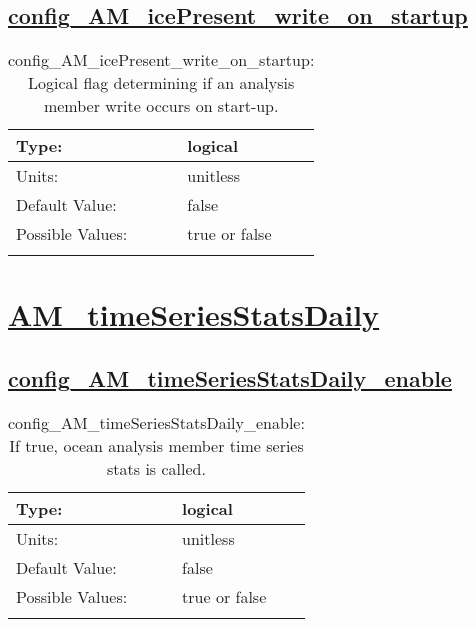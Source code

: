 \subsection[config\_AM\_icePresent\_write\_on\_startup]{\hyperref[sec:nm_tab_AM_icePresent]{config\_AM\_icePresent\_write\_on\_startup}}
\label{subsec:nm_sec_config_AM_icePresent_write_on_startup}
\begin{center}
\begin{longtable}{| p{2.0in} || p{4.0in} |}
    \hline
    Type: & logical \\
    \hline
    Units: & \si{unitless} \\
    \hline
    Default Value: & false \\
    \hline
    Possible Values: & true or false \\
    \hline
    \caption{config\_AM\_icePresent\_write\_on\_startup: Logical flag determining if an analysis member write occurs on start-up.}
\end{longtable}
\end{center}
\section[AM\_timeSeriesStatsDaily]{\hyperref[sec:nm_tab_AM_timeSeriesStatsDaily]{AM\_timeSeriesStatsDaily}}
\label{sec:nm_sec_AM_timeSeriesStatsDaily}
\subsection[config\_AM\_timeSeriesStatsDaily\_enable]{\hyperref[sec:nm_tab_AM_timeSeriesStatsDaily]{config\_AM\_timeSeriesStatsDaily\_enable}}
\label{subsec:nm_sec_config_AM_timeSeriesStatsDaily_enable}
\begin{center}
\begin{longtable}{| p{2.0in} || p{4.0in} |}
    \hline
    Type: & logical \\
    \hline
    Units: & \si{unitless} \\
    \hline
    Default Value: & false \\
    \hline
    Possible Values: & true or false \\
    \hline
    \caption{config\_AM\_timeSeriesStatsDaily\_enable: If true, ocean analysis member time series stats is called.}
\end{longtable}
\end{center}
